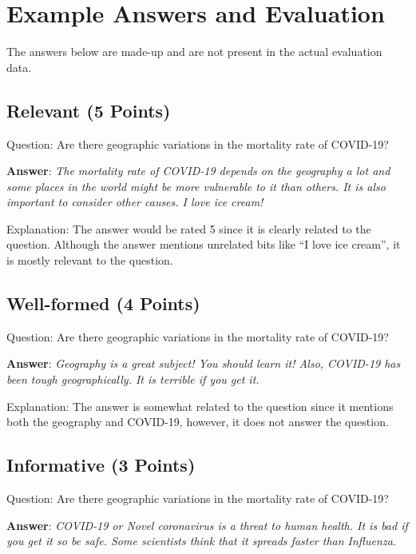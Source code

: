 \documentclass[11pt]{article}
\begin{document}
\section{Example Answers and Evaluation}

The answers below are made-up and are not present in the actual evaluation
data.

\subsection{Relevant (5 Points)}

Question: Are there geographic variations in the mortality rate of COVID-19?

\textbf{Answer}: \textit{The mortality rate of COVID-19 depends on the
geography a lot and some places in the world might be more vulnerable to it
than others. It is also important to consider other causes. I love ice cream!}

\medskip

Explanation: The answer would be rated 5 since it is clearly related to the
question. Although the answer mentions unrelated bits like ``I love ice
cream'', it is mostly relevant to the question.

\subsection{Well-formed (4 Points)}

Question: Are there geographic variations in the mortality rate of COVID-19?

\textbf{Answer}: \textit{Geography is a great subject! You should learn it!
Also, COVID-19 has been tough geographically. It is terrible if you get it.}

\medskip

Explanation: The answer is somewhat related to the question since it mentions
both the geography and COVID-19, however, it does not answer the question.

\subsection{Informative (3 Points)}

Question: Are there geographic variations in the mortality rate of COVID-19?

\textbf{Answer}: \textit{COVID-19 or Novel coronavirus is a threat to human
health. It is bad if you get it so be safe. Some scientists think that it
spreads faster than Influenza.}
\end{document}

